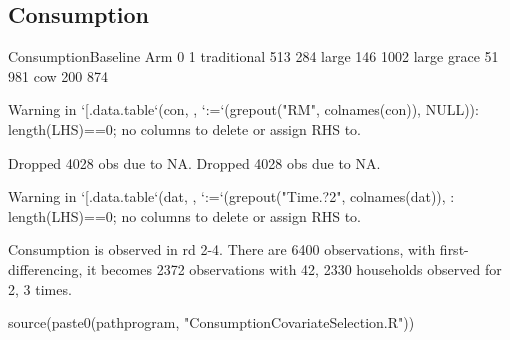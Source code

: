 \subsection{Consumption}



\begin{Schunk}
\begin{Soutput}
             ConsumptionBaseline
Arm              0    1
  traditional  513  284
  large        146 1002
  large grace   51  981
  cow          200  874
\end{Soutput}
\begin{Soutput}
Warning in `[.data.table`(con, , `:=`(grepout("RM", colnames(con)), NULL)): length(LHS)==0; no columns to delete or assign RHS to.
\end{Soutput}
\begin{Soutput}
Dropped 4028 obs due to NA.
Dropped 4028 obs due to NA.
\end{Soutput}
\begin{Soutput}
Warning in `[.data.table`(dat, , `:=`(grepout("Time.?2", colnames(dat)), : length(LHS)==0; no columns to delete or assign RHS to.
\end{Soutput}
\end{Schunk}

Consumption is observed in rd 2-4. There are 6400 observations, with first-differencing, it becomes 2372 observations with 42, 2330 households observed for 2, 3 times. 



\begin{Schunk}
\begin{Sinput}
source(paste0(pathprogram, "ConsumptionCovariateSelection.R"))
\end{Sinput}
\end{Schunk}






